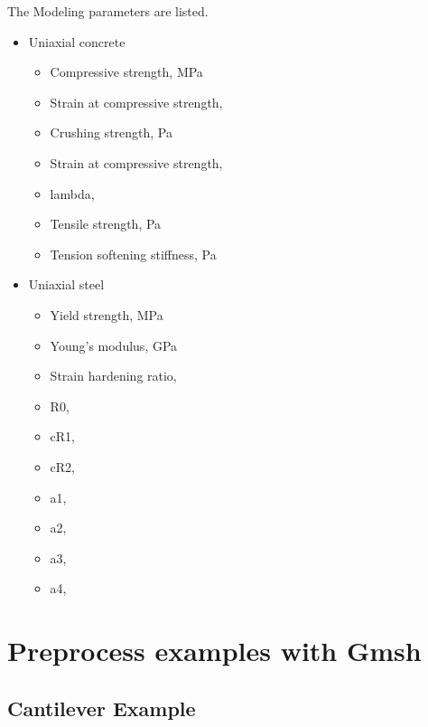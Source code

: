 The Modeling parameters are listed.
\begin{itemize}
  \item Uniaxial concrete 
  \begin{itemize}
    \item Compressive strength,  \enspace {} MPa
    \item Strain at compressive strength,  \enspace {}
    \item Crushing strength,  \enspace {} Pa
    \item Strain at compressive strength,  \enspace {}
    \item lambda, \enspace {}
    \item Tensile strength, \enspace {} Pa
    \item Tension softening stiffness, \enspace {} Pa
  \end{itemize}
  \item Uniaxial steel
  \begin{itemize}
    \item Yield strength, \enspace {} MPa
    \item Young's modulus, \enspace {} GPa
    \item Strain hardening ratio, \enspace {}
    \item R0, \enspace {}
    \item cR1,  \enspace {}
    \item cR2,  \enspace {}
    \item a1, \enspace {}
    \item a2, \enspace {}
    \item a3, \enspace {}
    \item a4, \enspace {}
  \end{itemize}
\end{itemize}


\clearpage
\newpage
\section{Preprocess examples with Gmsh}
\label{Preprocess_examples_with_Gmsh}
\subsection{Cantilever Example}



